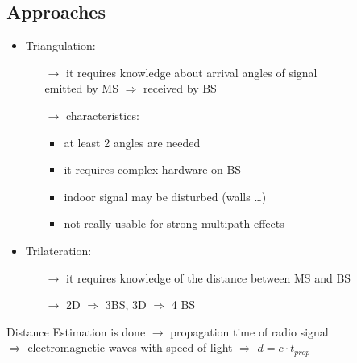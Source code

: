 \subsection{Approaches}
\begin{itemize}
    \item Triangulation:
    \begin{itemize}
        \item[$\rightarrow$] it requires knowledge about arrival angles of signal\\
        emitted by MS $\Rightarrow$ received by BS
        \item[$\rightarrow$] characteristics:
        \begin{itemize}
            \item at least 2 angles are needed
            \item it requires complex hardware on BS
            \item indoor signal may be disturbed (walls \dots)
            \item not really usable for strong multipath effects
        \end{itemize}
    \end{itemize}
    \item Trilateration:
    \begin{itemize}
        \item[$\rightarrow$] it requires knowledge of the distance between MS and BS
        \item[$\rightarrow$] 2D $\Rightarrow$ 3BS, 3D $\Rightarrow$ 4 BS
    \end{itemize}
\end{itemize}
\vspace*{0.3cm}
Distance Estimation is done $\rightarrow$ propagation
time of radio signal\\[0.15cm]
$\Rightarrow$ electromagnetic waves with speed of light $\Rightarrow$
$d = c \cdot t_{prop}$

